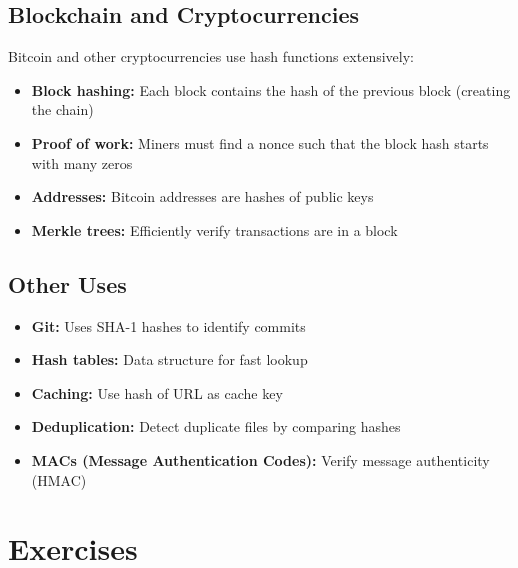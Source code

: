 \documentclass[11pt,a4paper]{report}
\begin{document}
\subsection{Blockchain and Cryptocurrencies}

Bitcoin and other cryptocurrencies use hash functions extensively:
\begin{itemize}
\item \textbf{Block hashing:} Each block contains the hash of the previous block (creating the chain)
\item \textbf{Proof of work:} Miners must find a nonce such that the block hash starts with many zeros
\item \textbf{Addresses:} Bitcoin addresses are hashes of public keys
\item \textbf{Merkle trees:} Efficiently verify transactions are in a block
\end{itemize}

\subsection{Other Uses}

\begin{itemize}
\item \textbf{Git:} Uses SHA-1 hashes to identify commits
\item \textbf{Hash tables:} Data structure for fast lookup
\item \textbf{Caching:} Use hash of URL as cache key
\item \textbf{Deduplication:} Detect duplicate files by comparing hashes
\item \textbf{MACs (Message Authentication Codes):} Verify message authenticity (HMAC)
\end{itemize}

\newpage
\section{Exercises}
\end{document}
